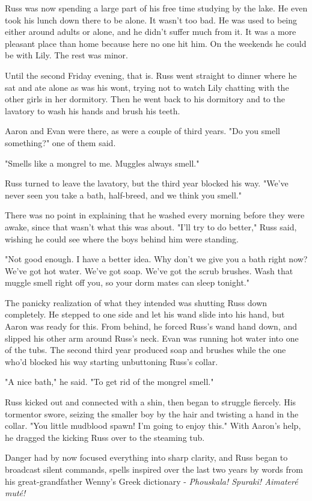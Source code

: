 Russ was now spending a large part of his free time studying by the lake. He even took his lunch down there to be alone. It wasn't too bad. He was used to being either around adults or alone, and he didn't suffer much from it. It was a more pleasant place than home because here no one hit him. On the weekends he could be with Lily. The rest was minor.

Until the second Friday evening, that is. Russ went straight to dinner where he sat and ate alone as was his wont, trying not to watch Lily chatting with the other girls in her dormitory. Then he went back to his dormitory and to the lavatory to wash his hands and brush his teeth.

Aaron and Evan were there, as were a couple of third years. "Do you smell something?" one of them said.

"Smells like a mongrel to me. Muggles always smell."

Russ turned to leave the lavatory, but the third year blocked his way. "We've never seen you take a bath, half-breed, and we think you smell."

There was no point in explaining that he washed every morning before they were awake, since that wasn't what this was about. "I'll try to do better," Russ said, wishing he could see where the boys behind him were standing.

"Not good enough. I have a better idea. Why don't we give you a bath right now? We've got hot water. We've got soap. We've got the scrub brushes. Wash that muggle smell right off you, so your dorm mates can sleep tonight."

The panicky realization of what they intended was shutting Russ down completely. He stepped to one side and let his wand slide into his hand, but Aaron was ready for this. From behind, he forced Russ's wand hand down, and slipped his other arm around Russ's neck. Evan was running hot water into one of the tubs. The second third year produced soap and brushes while the one who'd blocked his way starting unbuttoning Russ's collar.

"A nice bath," he said. "To get rid of the mongrel smell."

Russ kicked out and connected with a shin, then began to struggle fiercely. His tormentor swore, seizing the smaller boy by the hair and twisting a hand in the collar. "You little mudblood spawn! I'm going to enjoy this." With Aaron's help, he dragged the kicking Russ over to the steaming tub.

Danger had by now focused everything into sharp clarity, and Russ began to broadcast silent commands, spells inspired over the last two years by words from his great-grandfather Wenny's Greek dictionary - \emph{Phouskala! Spuraki! Aimateré muté!}

